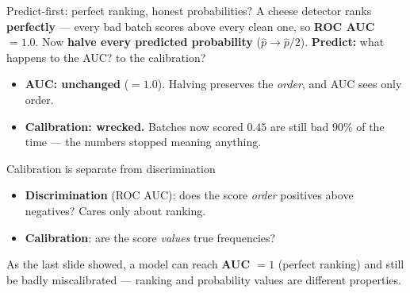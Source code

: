 \documentclass[aspectratio=169]{beamer}
\begin{document}
\begin{frame}{Predict-first: perfect ranking, honest probabilities?}
  A cheese detector ranks \textbf{perfectly} --- every bad batch scores above every clean one,
  so \textbf{ROC AUC $= 1.0$}. Now \textbf{halve every predicted probability}
  ($\hat p \to \hat p / 2$).
  \vfill
  \textbf{Predict:} what happens to the AUC? to the calibration?
  \vfill
  \begin{itemize}\small
    \item \textbf{AUC: unchanged} ($=1.0$). Halving preserves the \emph{order}, and AUC sees
      only order.
    \item \textbf{Calibration: wrecked.} Batches now scored $0.45$ are still bad $90\%$ of the
      time --- the numbers stopped meaning anything.
  \end{itemize}
  \vfill
\end{frame}

\begin{frame}{Calibration is separate from discrimination}
  \begin{itemize}
    \item \textbf{Discrimination} (ROC AUC): does the score \emph{order} positives above
      negatives? Cares only about ranking.
    \item \textbf{Calibration}: are the score \emph{values} true frequencies?
  \end{itemize}
  \vfill
  As the last slide showed, a model can reach \textbf{AUC $=1$} (perfect ranking) and still be
  badly miscalibrated --- ranking and probability values are different properties.
  \vfill
\end{frame}
\end{document}
